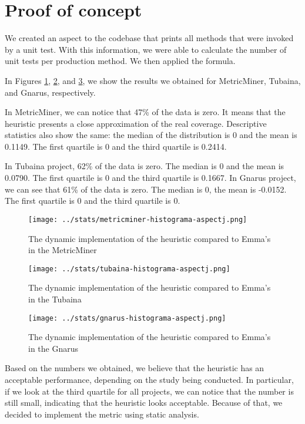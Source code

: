 \documentclass{sig-alternate}
\begin{document}
\section{Proof of concept}
\label{poc}

We created an aspect to the codebase that prints all methods that were invoked by a unit test. 
With this information, we were able to calculate the number of unit tests per production method. 
We then applied the formula. 

In Figures \ref{fig:metricminer-aj}, \ref{fig:tubaina-aj}, and
\ref{fig:gnarus-aj}, we show the results we obtained for MetricMiner, Tubaina, and Gnarus, respectively. 

In MetricMiner, we can notice that 47\% of the data is zero. It means that the heuristic
presents a close approximation of the real coverage. Descriptive statistics also show the same: 
the median of the distribution is 0 and the mean is 0.1149. The first quartile is 0 and the
third quartile is 0.2414.

In Tubaina project, 62\% of the data is zero. The median is 0 and the mean is 0.0790. The first quartile is
0 and the third quartile is 0.1667. 
In Gnarus project, we can see that 61\% of the data is zero. The median is 0, the mean is -0.0152. The first quartile is 0 and the third quartile is 0.

\begin{figure}[h!H]
  \centering
  \texttt{[image: ../stats/metricminer-histograma-aspectj.png]}
  \caption{The dynamic implementation of the heuristic compared to Emma's in the MetricMiner}
  \label{fig:metricminer-aj}
\end{figure}

\begin{figure}[h!H]
  \centering
  \texttt{[image: ../stats/tubaina-histograma-aspectj.png]}
  \caption{The dynamic implementation of the heuristic compared to Emma's in the Tubaina}
  \label{fig:tubaina-aj}
\end{figure}

\begin{figure}[h!H]
  \centering
  \texttt{[image: ../stats/gnarus-histograma-aspectj.png]}
  \caption{The dynamic implementation of the heuristic compared to Emma's in the Gnarus}
  \label{fig:gnarus-aj}
\end{figure}

Based on the numbers we obtained, we believe that the heuristic has an acceptable performance, depending on the study being conducted. 
In particular, if we look at the third quartile for all projects, we can notice that the number is
still small, indicating that the heuristic looks acceptable. Because of that,
we decided to implement the metric using static analysis. 
\end{document}
